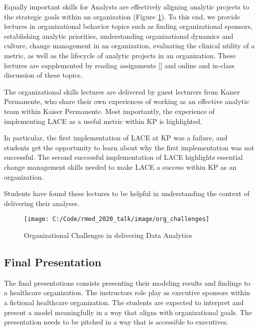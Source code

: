 Equally important skills for Analysts are effectively aligning analytic
projects to the strategic goals within an organization (Figure
\ref{fig:organization}). To this end, we provide lectures in
organizational behavior topics such as finding organizational sponsors,
establishing analytic priorities, understanding organizational dynamics
and culture, change management in an organization, evaluating the
clinical utility of a metric, as well as the lifecycle of analytic
projects in an organization. These lectures are supplemented by reading
assignments {[}{]} and online and in-class discussion of these topics.

The organizational skills lectures are delivered by guest lecturers from
Kaiser Permanente, who share their own experiences of working as an
effective analytic team within Kaiser Permanente. Most importantly, the
experience of implementing LACE as a useful metric within KP is
highlighted.

In particular, the first implementation of LACE at KP was a failure, and
students get the opportunity to learn about why the first implementation
was not successful. The second successful implementation of LACE
highlights essential change management skills needed to make LACE a
success within KP as an organization.

Students have found these lectures to be helpful in understanding the
context of delivering their analyses.

\begin{Schunk}
\begin{figure}

{\centering \texttt{[image: C:/Code/rmed\_2020\_talk/image/org\_challenges]} 

}

\caption[Organizational Challenges in delivering Data Analytics]{Organizational Challenges in delivering Data Analytics}\label{fig:organization}
\end{figure}
\end{Schunk}

\hypertarget{final-presentation}{%
\subsection{Final Presentation}\label{final-presentation}}

The final presentations consists presenting their modeling results and
findings to a healthcare organization. The instructors role play as
executive sponsors within a fictional healthcare organization. The
students are expected to interpret and present a model meaningfully in a
way that aligns with organizational goals. The presentation needs to be
pitched in a way that is accessible to executives.

